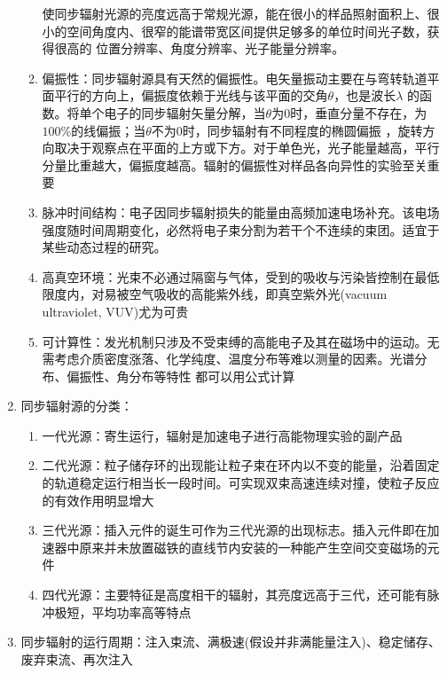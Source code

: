 \documentclass[12pt,a4paper]{article}
\begin{document}
\begin{enumerate}
\begin{enumerate}
                    使同步辐射光源的亮度远高于常规光源，能在很小的样品照射面积上、很小的空间角度内、很窄的能谱带宽区间提供足够多的单位时间光子数，获得很高的
                    位置分辨率、角度分辨率、光子能量分辨率。
                \item 偏振性：同步辐射源具有天然的偏振性。电矢量振动主要在与弯转轨道平面平行的方向上，偏振度依赖于光线与该平面的交角$\theta$，也是波长$\lambda$
                    的函数。将单个电子的同步辐射矢量分解，当$\theta$为0时，垂直分量不存在，为$100\%$的线偏振；当$\theta$不为0时，同步辐射有不同程度的椭圆偏振
                    ，旋转方向取决于观察点在平面的上方或下方。对于单色光，光子能量越高，平行分量比重越大，偏振度越高。辐射的偏振性对样品各向异性的实验至关重要
                \item 脉冲时间结构：电子因同步辐射损失的能量由高频加速电场补充。该电场强度随时间周期变化，必然将电子束分割为若干个不连续的束团。适宜于某些动态过程的研究。
                \item 高真空环境：光束不必通过隔窗与气体，受到的吸收与污染皆控制在最低限度内，对易被空气吸收的高能紫外线，即真空紫外光(vacuum ultraviolet, VUV)尤为可贵
                \item 可计算性：发光机制只涉及不受束缚的高能电子及其在磁场中的运动。无需考虑介质密度涨落、化学纯度、温度分布等难以测量的因素。光谱分布、偏振性、角分布等特性
                    都可以用公式计算
            \end{enumerate}
            \item 同步辐射源的分类：
                \begin{enumerate}
                    \item 一代光源：寄生运行，辐射是加速电子进行高能物理实验的副产品
                    \item 二代光源：粒子储存环的出现能让粒子束在环内以不变的能量，沿着固定的轨道稳定运行相当长一段时间。可实现双束高速连续对撞，使粒子反应的有效作用明显增大
                    \item 三代光源：插入元件的诞生可作为三代光源的出现标志。插入元件即在加速器中原来并未放置磁铁的直线节内安装的一种能产生空间交变磁场的元件
                    \item 四代光源：主要特征是高度相干的辐射，其亮度远高于三代，还可能有脉冲极短，平均功率高等特点
                \end{enumerate}
            \item 同步辐射的运行周期：注入束流、满极速(假设并非满能量注入)、稳定储存、废弃束流、再次注入
                \begin{enumerate}

\end{enumerate}
\end{enumerate}
\end{document}
